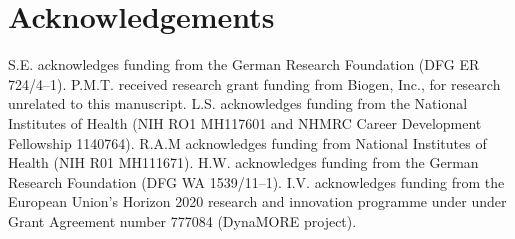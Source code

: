 \documentclass{lea}
\begin{document}






\section{Acknowledgements}

S.E. acknowledges funding from the German Research Foundation (DFG ER
724/4--1).
P.M.T. received research grant funding from Biogen, Inc., for research unrelated to this manuscript.
L.S. acknowledges funding from the National Institutes of Health (NIH RO1
MH117601 and NHMRC Career Development Fellowship 1140764).
R.A.M acknowledges funding from National Institutes of Health (NIH R01
MH111671).
H.W. acknowledges funding from the German Research Foundation (DFG WA
1539/11--1).
I.V. acknowledges funding from the European Union's Horizon 2020 research
and innovation programme under under Grant Agreement number 777084
(DynaMORE project).


\end{document}
